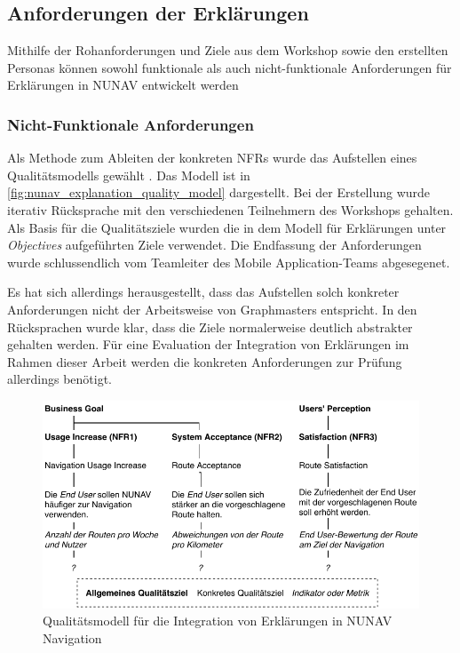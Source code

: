 \subsection{Anforderungen der Erklärungen}

Mithilfe der Rohanforderungen und Ziele aus dem Workshop sowie den erstellten Personas können sowohl funktionale als auch nicht-funktionale Anforderungen für Erklärungen in NUNAV entwickelt werden

\subsubsection{Nicht-Funktionale Anforderungen}


Als Methode zum Ableiten der konkreten NFRs wurde das Aufstellen eines Qualitätsmodells gewählt \cite{schneider2012abenteuer}. Das Modell ist in \autoref{fig:nunav_explanation_quality_model} dargestellt. Bei der Erstellung wurde iterativ Rücksprache mit den verschiedenen Teilnehmern des Workshops gehalten. Als Basis für die Qualitätsziele wurden die in dem Modell für Erklärungen unter \textit{Objectives} aufgeführten Ziele verwendet. Die Endfassung der Anforderungen wurde schlussendlich vom Teamleiter des \glqq Mobile Application\grqq{}-Teams abgesegenet.

Es hat sich allerdings herausgestellt, dass das Aufstellen solch konkreter Anforderungen nicht der Arbeitsweise von Graphmasters entspricht. In den Rücksprachen wurde klar, dass die Ziele normalerweise deutlich abstrakter gehalten werden. Für eine Evaluation der Integration von Erklärungen im Rahmen dieser Arbeit werden die konkreten Anforderungen zur Prüfung allerdings benötigt.

\begin{figure}[htb!]
    \centering
    \includegraphics[width=\textwidth]{contents/06_model_evaluation/01_integration/res/quality_model.pdf}
    \caption{Qualitätsmodell für die Integration von Erklärungen in NUNAV Navigation}
    \label{fig:nunav_explanation_quality_model}
\end{figure}


